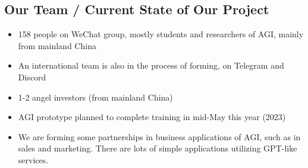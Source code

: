 \begin{preview}
\begin{minipage}{\textwidth}
\begin{itemize}
		
\end{itemize}

\end{minipage}
\end{preview}

\begin{preview}
\begin{minipage}{\textwidth}
	\setlength{\parskip}{0.4\baselineskip}

\section{Our Team / Current State of Our Project}

\begin{itemize}
	\item 158 people on WeChat group, mostly students and researchers of AGI, mainly from mainland China
	
	\item An international team is also in the process of forming, on Telegram and Discord
	
	\item 1-2 angel investors (from mainland China)

	\item AGI prototype planned to complete training in mid-May this year (2023)

	\item We are forming some partnerships in business applications of AGI, such as in sales and marketing.  There are lots of simple applications utilizing GPT-like services.
\end{itemize}

\end{minipage}
\end{preview}

